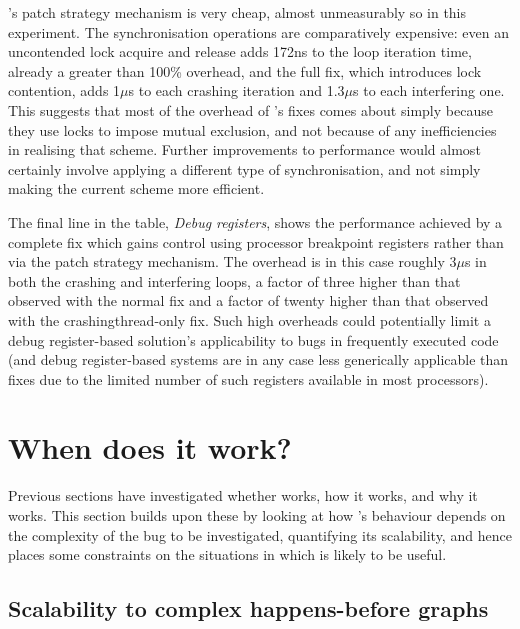 {\technique}'s patch strategy mechanism is very cheap, almost
unmeasurably so in this experiment.  The synchronisation operations
are comparatively expensive: even an uncontended lock acquire and
release adds 172ns to the loop iteration time, already a greater than
100\% overhead, and the full fix, which introduces lock contention,
adds 1$\mu$s to each crashing iteration and 1.3$\mu$s to each
interfering one.  This suggests that most of the overhead of
{\technique}'s fixes comes about simply because they use locks to
impose mutual exclusion, and not because of any inefficiencies in
realising that scheme.  Further improvements to performance would
almost certainly involve applying a different type of synchronisation,
and not simply making the current scheme more efficient.

The final line in the table, \textit{Debug registers}, shows the
performance achieved by a complete fix which gains control using
processor breakpoint registers rather than via the patch strategy
mechanism.  The overhead is in this case roughly 3$\mu$s in both the
crashing and interfering loops, a factor of three higher than that
observed with the normal {\technique} fix and a factor of twenty
higher than that observed with the \gls{crashingthread}-only
{\technique} fix.  Such high overheads could potentially limit a debug
register-based solution's applicability to bugs in frequently executed
code (and debug register-based systems are in any case less
generically applicable than {\technique} fixes due to the limited
number of such registers available in most processors).

\section{When does it work?}
\label{sect:eval:does_it_scale}

Previous sections have investigated whether {\technique} works,
how it works, and why it works.  This section builds upon these by
looking at how {\technique}'s behaviour depends on the complexity
of the bug to be investigated, quantifying its scalability, and hence
places some constraints on the situations in which {\technique} is
likely to be useful.

\subsection{Scalability to complex happens-before graphs}
\label{sect:eval:complex_hb}

